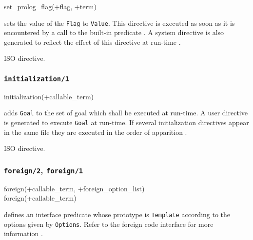 \begin{TemplatesOneCol}
set\_prolog\_flag(+flag, +term)

\end{TemplatesOneCol}

\Description

 sets the value of the
 \texttt{Flag} to \texttt{Value}. This directive is
executed as soon as it is encountered by a call to the built-in predicate
 . A system directive
is also generated to reflect the effect of this directive at run-time
.

\Portability

ISO directive.

\subsubsection{\texttt{initialization/1}}
\label{initialization/1}

\begin{TemplatesOneCol}
initialization(+callable\_term)

\end{TemplatesOneCol}

\Description

 adds \texttt{Goal} to the set of goal which
shall be executed at run-time. A user directive is generated to execute
\texttt{Goal} at run-time. If several initialization directives appear in
the same file they are executed in the order of apparition .

\Portability

ISO directive.

\subsubsection{\texttt{foreign/2},
\texttt{foreign/1}}
\label{foreign/2}

\begin{TemplatesOneCol}
foreign(+callable\_term, +foreign\_option\_list)\\
foreign(+callable\_term)

\end{TemplatesOneCol}

\Description

 defines an interface predicate whose
prototype is \texttt{Template} according to the options given by
\texttt{Options}. Refer to the foreign code interface for more information
.

